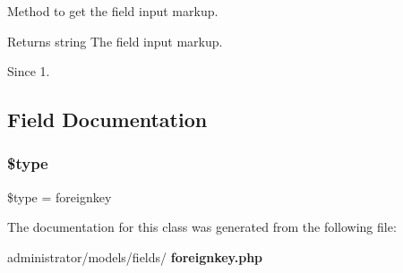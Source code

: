 Method to get the field input markup.

\begin{DoxyReturn}{Returns}
string The field input markup.
\end{DoxyReturn}
\begin{DoxySince}{Since}
1. 
\end{DoxySince}


\subsection{Field Documentation}
\mbox{\label{class_j_form_field_foreign_key_a9a4a6fba2208984cabb3afacadf33919}} 
\subsubsection{\$type}
{\footnotesize\ttfamily \$type = \textquotesingle{}foreignkey\textquotesingle{}\hspace{0.3cm}{\ttfamily [protected]}}



The documentation for this class was generated from the following file\+:\begin{DoxyCompactItemize}
\item 
administrator/models/fields/\textbf{ foreignkey.\+php}\end{DoxyCompactItemize}
